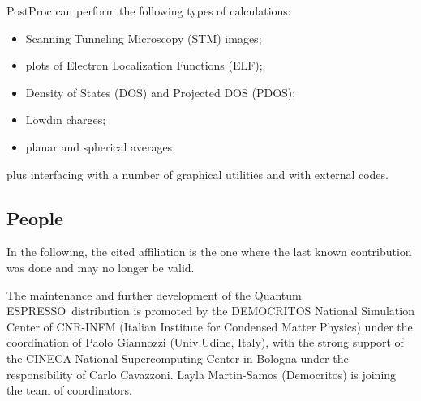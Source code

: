 \documentclass[12pt,a4paper]{article}
\def\qe{{\sc Quantum ESPRESSO}}
\begin{document}
PostProc can perform the following types of calculations:
\begin{itemize}
  \item Scanning Tunneling Microscopy (STM) images;
  \item plots of Electron Localization Functions (ELF);
  \item Density of States (DOS) and Projected DOS (PDOS);
  \item L\"owdin charges;
  \item planar and spherical averages;
\end{itemize}
plus interfacing with a number of graphical utilities and with 
external codes.

\subsection{People}

In the following, the cited affiliation is the one where the last known 
contribution was done and may no longer be valid.

The maintenance and further development of the \qe\ distribution
is promoted by the DEMOCRITOS National Simulation Center 
of CNR-INFM
(Italian Institute for Condensed Matter Physics) under the 
coordination of
Paolo Giannozzi (Univ.Udine, Italy), with the strong support
of the CINECA National Supercomputing Center in Bologna under 
the responsibility of Carlo Cavazzoni. Layla Martin-Samos 
(Democritos) is joining the team of coordinators.
     
\end{document}
